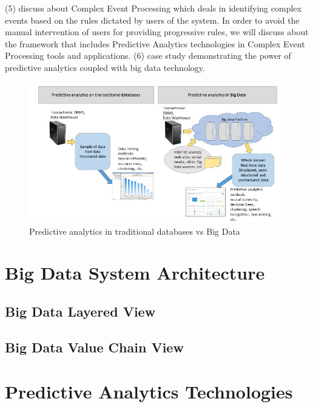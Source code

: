 \documentclass[runningheads]{llncs}
\begin{document}
(5) discuss about Complex Event Processing which deals in identifying complex events based on the rules dictated by users of the system. In order to avoid the manual intervention of users for providing progressive rules, we will discuss about the framework that includes Predictive Analytics technologies in Complex Event Processing tools and applications. \newline
(6) case study demonstrating the power of predictive analytics coupled with big data technology.
\begin{figure}[htbp]
	\centering
	\vspace{-0.85cm}
	\hspace*{-0.45cm}
	\includegraphics[scale=0.6]{Figure3.jpg}
	\caption{Predictive analytics in traditional databases vs Big Data}
	\label{fig:Figure3}
	\vspace{3.5cm}
\end{figure}
\section{Big Data System Architecture}

\subsection{Big Data Layered View}
\subsection{Big Data Value Chain View}

\section{Predictive Analytics Technologies}
\end{document}
